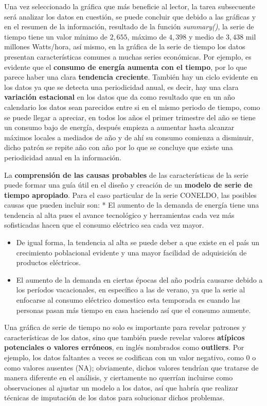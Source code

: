 \documentclass[
  spanish,
]{book}
\providecommand{\tightlist}{%
  \setlength{\itemsep}{0pt}\setlength{\parskip}{0pt}}
\theoremstyle{remark}
\begin{document}
Una vez seleccionado la gráfica que más beneficie al lector, la tarea subsecuente será analizar los datos en cuestión, se puede concluir que debido a las gráficas y en el resumen de la información, resultado de la función \emph{summary()}, la serie de tiempo tiene un valor mínimo de \(2,655\), máximo de \(4,398\) y medio de \(3,438\) mil millones Watts/hora, así mismo, en la gráfica de la serie de tiempo los datos presentan características comunes a muchas series económicas. Por ejemplo, es evidente que el \textbf{consumo de energía aumenta con el tiempo}, por lo que parece haber una clara \textbf{tendencia creciente}. También hay un ciclo evidente en los datos ya que se detecta una periodicidad anual, es decir, hay una clara \textbf{variación estacional} en los datos que da como resultado que en un año calendario los datos sean parecidos entre si en el mismo periodo de tiempo, como se puede llegar a apreciar, en todos los años el primer trimestre del año se tiene un consumo bajo de energía, después empieza a aumentar hasta alcanzar máximos locales a mediados de año y de ahí su consumo comienza a disminuir, dicho patrón se repite año con año por lo que se concluye que existe una periodicidad anual en la información.

La \textbf{comprensión de las causas probables} de las características de la serie puede formar una guía útil en el diseño y creación de un \textbf{modelo de serie de tiempo apropiado}. Para el caso particular de la serie CONELDO, las posibles causas que pueden incluir son:
* El aumento de la demanda de energía tiene una tendencia al alta pues el avance tecnológico y herramientas cada vez más sofisticadas hacen que el consumo eléctrico sea cada vez mayor.

\begin{itemize}
\tightlist
\item
  De igual forma, la tendencia al alta se puede deber a que existe en el país un crecimiento poblacional evidente y una mayor facilidad de adquisición de productos eléctricos.
\item
  El aumento de la demanda en ciertas épocas del año podría causarse debido a los períodos vacacionales, en específico a las de verano, ya que la serie al enfocarse al consumo eléctrico domestico esta temporada es cuando las personas pasan más tiempo en casa haciendo así que el consumo aumente.
\end{itemize}

Una gráfica de serie de tiempo no solo es importante para revelar patrones y características de los datos, sino que también puede revelar valores \textbf{atípicos potenciales o valores erróneos}, en inglés nombrados como \textbf{outliers}. Por ejemplo, los datos faltantes a veces se codifican con un valor negativo, como 0 o como valores ausentes (NA); obviamente, dichos valores tendrían que tratarse de manera diferente en el análisis, y ciertamente no querrían incluirse como observaciones al ajustar un modelo a los datos, así que habría que realizar técnicas de imputación de los datos para solucionar dichos problemas.
\end{document}
